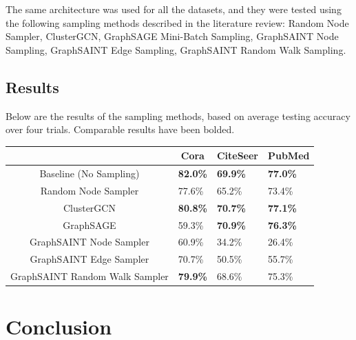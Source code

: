 \documentclass{article}
\begin{document}
	The same architecture was used for all the datasets, and they were tested using the following sampling methods described in the literature review: Random Node Sampler, ClusterGCN, GraphSAGE Mini-Batch Sampling, GraphSAINT Node Sampling, GraphSAINT Edge Sampling, GraphSAINT Random Walk Sampling. 


	\subsection{Results}
	
	Below are the results of the sampling methods, based on average testing accuracy over four trials. Comparable results have been bolded. 
	

	\begin{center}

		\begin{tabular}{c|l|l|l|}
			\cline{2-4}
			& \multicolumn{1}{c|}{Cora} & \multicolumn{1}{c|}{CiteSeer} & PubMed          \\ \hline
			\multicolumn{1}{|c|}{Baseline (No Sampling)}         & \textbf{82.0\%}           & \textbf{69.9\%}               & \textbf{77.0\%} \\ \hline
			\multicolumn{1}{|c|}{Random Node Sampler}            & 77.6\%                    & 65.2\%                        & 73.4\%          \\ \hline
			\multicolumn{1}{|c|}{ClusterGCN}                     & \textbf{80.8\%}           & \textbf{70.7\%}               & \textbf{77.1\%} \\ \hline
			\multicolumn{1}{|c|}{GraphSAGE}                      & 59.3\%                    & \textbf{70.9\%}               & \textbf{76.3\%} \\ \hline
			\multicolumn{1}{|c|}{GraphSAINT Node Sampler}        & 60.9\%                    & 34.2\%                        & 26.4\%          \\ \hline
			\multicolumn{1}{|c|}{GraphSAINT Edge Sampler}        & 70.7\%                    & 50.5\%                        & 55.7\%          \\ \hline
			\multicolumn{1}{|c|}{GraphSAINT Random Walk Sampler} & \textbf{79.9\%}           & 68.6\%                        & 75.3\%          \\ \hline
		\end{tabular}
	
	\end{center}

	\section{Conclusion}
	
\end{document}
